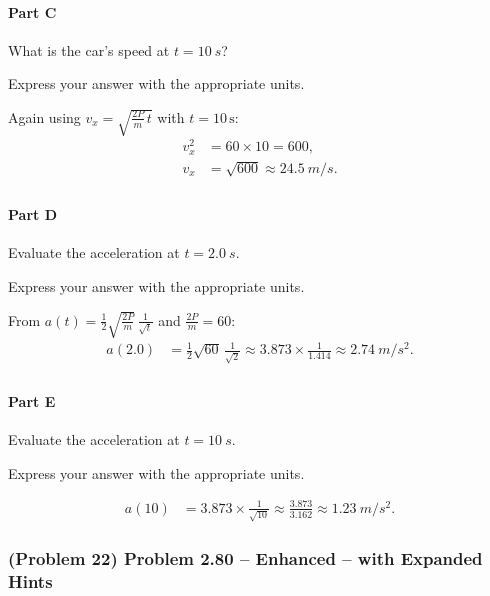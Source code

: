 \paragraph{Part C}
What is the car's speed at \( t = \SI{10}{s}\)?

Express your answer with the appropriate units.

\begin{solution}
	Again using \( v_x = \sqrt{\tfrac{2P}{m}\,t}\) with \( t = 10\,\mathrm{s}\):
	\begin{align*}
		v_x^2 &= 60 \times 10 = 600,\\
		v_x &= \sqrt{600} \approx \SI{24.5}{m/s}.\\
	\end{align*}
\end{solution}

\paragraph{Part D}
Evaluate the acceleration at \( t = \SI{2.0}{s}\).

Express your answer with the appropriate units.

\begin{solution}
	From \( a(t) = \frac{1}{2}\sqrt{\frac{2P}{m}}\,\frac{1}{\sqrt{t}} \) and \( \tfrac{2P}{m}=60\):
	\begin{align*}
		a(2.0) &= \frac{1}{2}\sqrt{60}\,\frac{1}{\sqrt{2}} \approx 3.873\times\frac{1}{1.414} \approx \SI{2.74}{m/s^2}.\\
	\end{align*}
\end{solution}

\paragraph{Part E}
Evaluate the acceleration at \( t = \SI{10}{s}\).

Express your answer with the appropriate units.

\begin{solution}
	\begin{align*}
		a(10) &= 3.873\times\frac{1}{\sqrt{10}} \approx \frac{3.873}{3.162} \approx \SI{1.23}{m/s^2}.
	\end{align*}
\end{solution}

\newpage


\subsubsection{(Problem 22) Problem 2.80 -- Enhanced -- with Expanded Hints}

